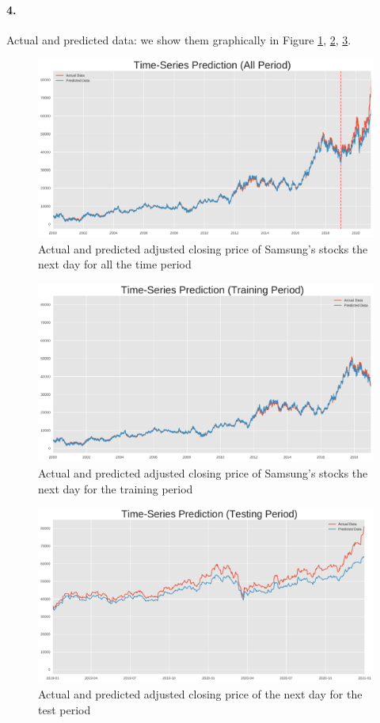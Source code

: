\documentclass[12pt]{article}
\begin{document}
\paragraph{4.} Actual and predicted data: we show them graphically in Figure \ref{fig:all}, \ref{fig:train}, \ref{fig:test}.
\begin{figure}
    \centering
    \includegraphics[width=\textwidth]{images/prediction_base_all.pdf}
    \caption{Actual and predicted adjusted closing price of Samsung's stocks the next day for all the time period}
    \label{fig:all}
\end{figure}
\begin{figure}
    \centering
    \includegraphics[width=\textwidth]{images/prediction_base_train.pdf}
    \caption{Actual and predicted adjusted closing price of Samsung's stocks the next day for the training period}
    \label{fig:train}
\end{figure}
\begin{figure}
    \centering
    \includegraphics[width=\textwidth]{images/prediction_base_test.pdf}
    \caption{Actual and predicted adjusted closing price of the next day for the test period}
    \label{fig:test}
\end{figure}
\end{document}
